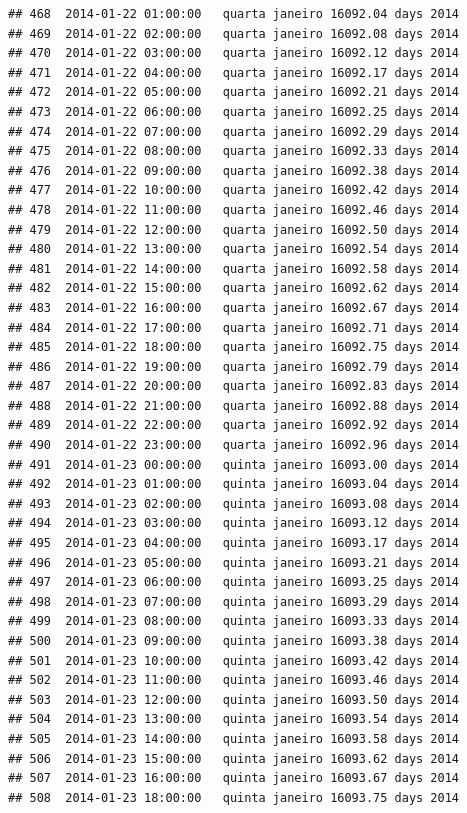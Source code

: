 \documentclass[]{book}
\begin{document}
\begin{verbatim}
## 468  2014-01-22 01:00:00   quarta janeiro 16092.04 days 2014
## 469  2014-01-22 02:00:00   quarta janeiro 16092.08 days 2014
## 470  2014-01-22 03:00:00   quarta janeiro 16092.12 days 2014
## 471  2014-01-22 04:00:00   quarta janeiro 16092.17 days 2014
## 472  2014-01-22 05:00:00   quarta janeiro 16092.21 days 2014
## 473  2014-01-22 06:00:00   quarta janeiro 16092.25 days 2014
## 474  2014-01-22 07:00:00   quarta janeiro 16092.29 days 2014
## 475  2014-01-22 08:00:00   quarta janeiro 16092.33 days 2014
## 476  2014-01-22 09:00:00   quarta janeiro 16092.38 days 2014
## 477  2014-01-22 10:00:00   quarta janeiro 16092.42 days 2014
## 478  2014-01-22 11:00:00   quarta janeiro 16092.46 days 2014
## 479  2014-01-22 12:00:00   quarta janeiro 16092.50 days 2014
## 480  2014-01-22 13:00:00   quarta janeiro 16092.54 days 2014
## 481  2014-01-22 14:00:00   quarta janeiro 16092.58 days 2014
## 482  2014-01-22 15:00:00   quarta janeiro 16092.62 days 2014
## 483  2014-01-22 16:00:00   quarta janeiro 16092.67 days 2014
## 484  2014-01-22 17:00:00   quarta janeiro 16092.71 days 2014
## 485  2014-01-22 18:00:00   quarta janeiro 16092.75 days 2014
## 486  2014-01-22 19:00:00   quarta janeiro 16092.79 days 2014
## 487  2014-01-22 20:00:00   quarta janeiro 16092.83 days 2014
## 488  2014-01-22 21:00:00   quarta janeiro 16092.88 days 2014
## 489  2014-01-22 22:00:00   quarta janeiro 16092.92 days 2014
## 490  2014-01-22 23:00:00   quarta janeiro 16092.96 days 2014
## 491  2014-01-23 00:00:00   quinta janeiro 16093.00 days 2014
## 492  2014-01-23 01:00:00   quinta janeiro 16093.04 days 2014
## 493  2014-01-23 02:00:00   quinta janeiro 16093.08 days 2014
## 494  2014-01-23 03:00:00   quinta janeiro 16093.12 days 2014
## 495  2014-01-23 04:00:00   quinta janeiro 16093.17 days 2014
## 496  2014-01-23 05:00:00   quinta janeiro 16093.21 days 2014
## 497  2014-01-23 06:00:00   quinta janeiro 16093.25 days 2014
## 498  2014-01-23 07:00:00   quinta janeiro 16093.29 days 2014
## 499  2014-01-23 08:00:00   quinta janeiro 16093.33 days 2014
## 500  2014-01-23 09:00:00   quinta janeiro 16093.38 days 2014
## 501  2014-01-23 10:00:00   quinta janeiro 16093.42 days 2014
## 502  2014-01-23 11:00:00   quinta janeiro 16093.46 days 2014
## 503  2014-01-23 12:00:00   quinta janeiro 16093.50 days 2014
## 504  2014-01-23 13:00:00   quinta janeiro 16093.54 days 2014
## 505  2014-01-23 14:00:00   quinta janeiro 16093.58 days 2014
## 506  2014-01-23 15:00:00   quinta janeiro 16093.62 days 2014
## 507  2014-01-23 16:00:00   quinta janeiro 16093.67 days 2014
## 508  2014-01-23 18:00:00   quinta janeiro 16093.75 days 2014

\end{verbatim}
\end{document}
